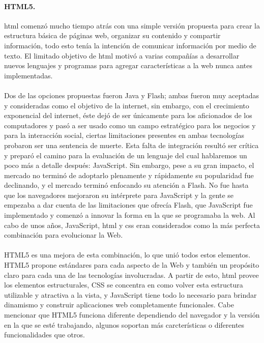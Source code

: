 \documentclass[12pt, a4paper, titlepage]{article}
\begin{document}
				\paragraph{HTML5. \\}
				\acrlong{html} comenzó mucho tiempo atrás con una simple versión propuesta para crear la estructura básica de páginas web, organizar su contenido y compartir información, todo esto tenía la intención de comunicar información por medio de texto. El limitado objetivo de \acrshort{html} motivó a varias compañías a desarrollar nuevos lenguajes y programas para agregar características a la web nunca antes implementadas. \\\\
				Dos de las opciones propuestas fueron Java y \Gls{Flash}; ambas fueron muy aceptadas y consideradas como el objetivo de la internet, sin embargo, con el crecimiento exponencial del internet, éste dejó de ser únicamente para los aficionados de los computadores y pasó a ser usado como un campo estratégico para los negocios y para la interacción social, ciertas limitaciones presentes en ambas tecnologías probaron ser una sentencia de muerte. Esta falta de integración resultó ser crítica y preparó el camino para la evaluación de un lenguaje del cual hablaremos un poco más a detalle después: JavaScript. Sin embargo, pese a su gran impacto, el mercado no terminó de adoptarlo plenamente y rápidamente su popularidad fue declinando, y el mercado terminó enfocando su atención a Flash. No fue hasta que los navegadores mejoraron su intérprete para JavaScript y la gente se empezaba a dar cuenta de las limitaciones que ofrecía Flash, que JavaScript fue implementado y comenzó a innovar la forma en la que se programaba la web. Al cabo de unos años, JavaScript, \acrshort{html} y \acrshort{css} eran considerados como la más perfecta combinación para evolucionar la Web. \\\\
				HTML5 es una mejora de esta combinación, lo que unió todos estos elementos. HTML5 propone estándares para cada aspecto de la Web y también un propósito claro para cada una de las tecnologías involucradas. A partir de esto, \acrshort{html} provee los elementos estructurales, CSS se concentra en como volver esta estructura utilizable y atractiva a la vista, y JavaScript tiene todo lo necesario para brindar dinamismo y construir aplicaciones web completamente funcionales. Cabe mencionar que HTML5 funciona diferente dependiendo del navegador y la versión en la que se esté trabajando, algunos soportan más carcterísticas o diferentes funcionalidades que otros.
				\cite{refElGranLibro}%
				
\end{document}
